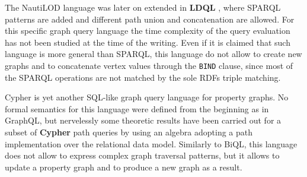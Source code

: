 The NautiLOD language was later on extended in \textbf{LDQL} \cite{Hartig2015,HartigP15a}, where SPARQL patterns are added
and different path union and concatenation are allowed. For this specific graph query language the time
complexity of the query evaluation has not been studied at the time of the writing. Even if it is claimed that
such language is more general than SPARQL, this language do not allow to create new graphs and to concatenate
vertex values through the \texttt{BIND} clause, since most of the SPARQL operations are not matched
by the sole RDFs triple matching.

Cypher \cite{Neo4jMan,Robinson,CypherCheat} is yet another SQL-like graph query language for property graphs. No formal semantics for this
language were defined from the beginning as in GraphQL, but nervelessly some theoretic results have been carried out
for a subset of \textbf{Cypher} path queries \cite{Neo4jAlg} by using an algebra adopting a path implementation
over the relational data model. Similarly to BiQL, this language does not allow to express complex
graph traversal patterns, but it allows to update a property graph and to produce a new graph
as a result.

